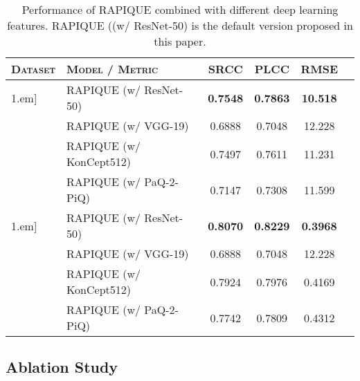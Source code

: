 \documentclass[transmag]{IEEEtran}
\begin{document}
\begin{table}[!t]
\setlength{\tabcolsep}{3.5pt}
\renewcommand{\arraystretch}{1.1}
\centering
\caption{Performance of RAPIQUE combined with different deep learning features. RAPIQUE ((w/ ResNet-50) is the default version proposed in this paper.}
\label{table:fusion}
\begin{tabular}{llcccc}
\toprule
\textsc{Dataset}  & \textsc{Model} / \textsc{Metric} & SRCC      & PLCC     & RMSE    \\
\hline\-1.em]
\multirow{4}{*}{LIVE-VQC}   & 
RAPIQUE (w/ ResNet-50)  & \textbf{0.7548} & \textbf{0.7863} & \textbf{10.518} \\
& RAPIQUE (w/ VGG-19) & 0.6888 & 0.7048 & 12.228 \\
& RAPIQUE (w/ KonCept512) & 0.7497 & 0.7611 & 11.231 \\
& RAPIQUE (w/ PaQ-2-PiQ)  & 0.7147 & 0.7308 & 11.599 \\
\hline\-1.em]
\multirow{4}{*}{All-Combined} &
RAPIQUE (w/ ResNet-50)  & \textbf{0.8070} & \textbf{0.8229} & \textbf{0.3968} \\
& RAPIQUE (w/ VGG-19) & 0.6888 & 0.7048 & 12.228 \\
& RAPIQUE (w/ KonCept512) & 0.7924 & 0.7976 & 0.4169 \\
& RAPIQUE (w/ PaQ-2-PiQ)  & 0.7742 & 0.7809 & 0.4312 \\

\toprule
\end{tabular}
\end{table}

\subsection{Ablation Study}
\label{ssec:ablation_study}
\end{document}
